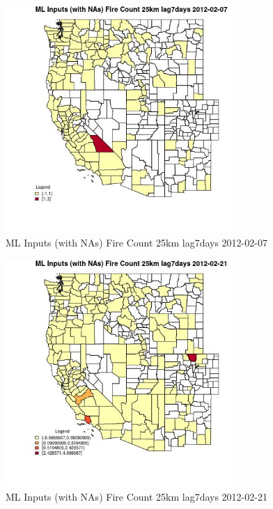 \begin{figure} 
\centering  
\includegraphics[width=0.77\textwidth]{Code_Outputs/Report_ML_input_PM25_Step4_part_f_de_duplicated_aveswNAs_CountyFire_Count_25km_lag7daysMean2012-02-07.jpg} 
\caption{\label{fig:Report_ML_input_PM25_Step4_part_f_de_duplicated_aveswNAsCountyFire_Count_25km_lag7daysMean2012-02-07}ML Inputs (with NAs) Fire Count 25km lag7days 2012-02-07} 
\end{figure} 
 

\begin{figure} 
\centering  
\includegraphics[width=0.77\textwidth]{Code_Outputs/Report_ML_input_PM25_Step4_part_f_de_duplicated_aveswNAs_CountyFire_Count_25km_lag7daysMean2012-02-21.jpg} 
\caption{\label{fig:Report_ML_input_PM25_Step4_part_f_de_duplicated_aveswNAsCountyFire_Count_25km_lag7daysMean2012-02-21}ML Inputs (with NAs) Fire Count 25km lag7days 2012-02-21} 
\end{figure} 
 

